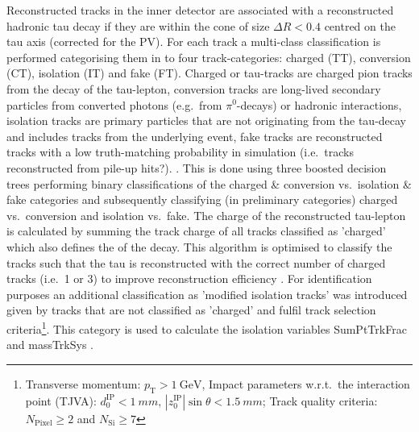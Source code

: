 %
Reconstructed tracks in the inner detector are associated with a reconstructed
hadronic tau decay if they are within the cone of size $\Delta R < 0.4$ centred
on the tau axis (corrected for the PV).
%
%
%
For each track a multi-class classification is performed categorising them in to
four track-categories: charged (TT), conversion (CT), isolation (IT) and fake
(FT). Charged or tau-tracks are charged pion tracks from the decay of the
tau-lepton, conversion tracks are long-lived secondary particles from converted
photons (e.g.\ from $\pi^0$-decays) or hadronic interactions, isolation tracks
are primary particles that are not originating from the tau-decay and includes
tracks from the underlying event, fake tracks are reconstructed tracks with a low
truth-matching probability in simulation (i.e.\ tracks reconstructed from
pile-up hits?). . This is
done using three boosted decision trees performing binary classifications of the
charged \& conversion vs.\ isolation \& fake categories and subsequently
classifying (in preliminary categories) charged vs.\ conversion and isolation
vs.\ fake.  The charge
of the reconstructed tau-lepton is calculated by summing the track charge of all
tracks classified as 'charged' which also defines the  of the
decay. This algorithm is optimised to classify the tracks such that the tau is
reconstructed with the correct number of charged tracks (i.e.\ 1 or 3) to
improve reconstruction efficiency . For identification purposes an additional
classification as 'modified isolation tracks' was introduced given by tracks
that are not classified as 'charged' and fulfil track selection
criteria\footnote{Transverse momentum:
  $p_\mathrm{T} > \SI{1}{\giga\electronvolt}$, Impact parameters w.r.t.\ the
  interaction point (TJVA): $d_0^\text{IP} < \SI{1}{mm}$,
  $|z_0^\text{IP}| \sin\theta < \SI{1.5}{mm}$; Track quality criteria:
  $N_\text{Pixel} \geq 2$ and $N_\text{Si} \geq 7$}. This category is used to
calculate the isolation variables SumPtTrkFrac and massTrkSys .


